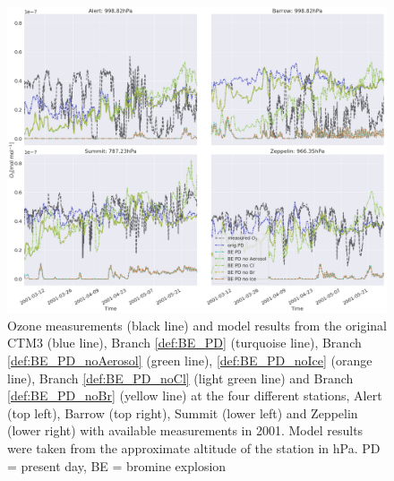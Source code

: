\begin{figure}
    \centering
    \includegraphics[width = \linewidth]{Chapter6_Results/images/ozone_removingHetReacts.png}
    \caption{Ozone measurements (black line) and model results from the original CTM3 (blue line), Branch \ref{def:BE_PD} (turquoise line), Branch \ref{def:BE_PD_noAerosol} (green line), \ref{def:BE_PD_noIce} (orange line), Branch \ref{def:BE_PD_noCl} (light green line) and Branch \ref{def:BE_PD_noBr} (yellow line) at the four different stations, Alert (top left), Barrow (top right), Summit (lower left) and Zeppelin (lower right) with available measurements in 2001. Model results were taken from the approximate altitude of the station in hPa. PD = present day, BE = bromine explosion}
    \label{fig:test_RemoveHetReacts}
\end{figure}